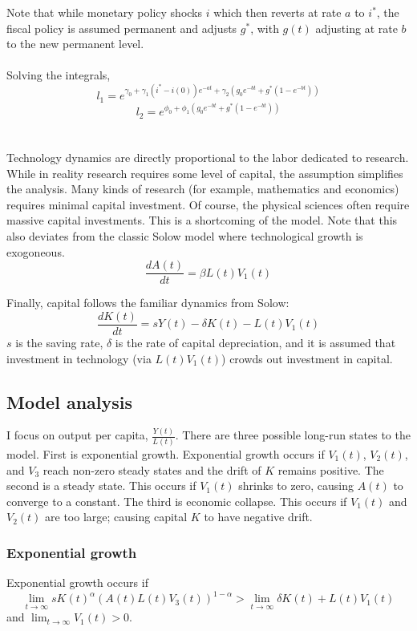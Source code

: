 \documentclass[12pt]{article}
\theoremstyle{definition}
\begin{document}
Note that while monetary policy shocks \(i\) which then reverts at rate \(a\) to \(i^*\), the fiscal policy is assumed permanent and adjusts \(g^*\), with \(g(t)\) adjusting at rate \(b\) to the new permanent level.
\\
\\
Solving the integrals,
\[l_1=e^{\gamma_0+\gamma_1  \left(i^*-i(0)\right)e^{-a t}+\gamma_2 \left( g_0 e^{-b t}+g^*\left(1-e^{-b t}\right) \right) }\]
\[l_2=e^{\phi_0+\phi_1  \left( g_0 e^{-b t}+g^*\left(1-e^{-b t}\right) \right)}\]
\\
\\
Technology dynamics are directly proportional to the labor dedicated to research.  While in reality research requires some level of capital, the assumption simplifies the analysis.  Many kinds of research (for example, mathematics and economics) requires minimal capital investment.  Of course, the physical sciences often require massive capital investments.  This is a shortcoming of the model.  Note that this also deviates from the classic Solow model where technological growth is exogoneous.
\[\frac{dA(t)}{dt}=\beta L(t) V_1(t)\]

Finally, capital follows the familiar dynamics from Solow:
\[\frac{dK(t)}{dt}=s Y(t) - \delta K(t)-  L(t) V_1(t)\]
\(s\) is the saving rate, \(\delta\) is the rate of capital depreciation, and it is assumed that investment in technology (via \( L(t) V_1(t)\)) crowds out investment in capital.  

\subsection{Model analysis}

I focus on output per capita, \(\frac{Y(t)}{L(t)}\). There are three possible long-run states to the model.  First is exponential growth.  Exponential growth occurs if \(V_1(t)\), \(V_2(t)\), and \(V_3\) reach non-zero steady states and the drift of \(K\) remains positive.  The second is a steady state.  This occurs if \(V_1(t)\) shrinks to zero, causing \(A(t)\) to converge to a constant.  The third is economic collapse.  This occurs if \(V_1(t)\) and \(V_2(t)\) are too large; causing capital \(K\) to have negative drift. 

\subsubsection{Exponential growth}
Exponential growth occurs if  
\[\lim_{t \to \infty} s K(t)^\alpha (A(t)L(t)V_3(t))^{1-\alpha} > \lim_{t \to \infty} \delta K(t) +  L(t) V_1(t)\] 
and \(\lim_{t \to \infty} V_1(t) > 0 \).
\end{document}
